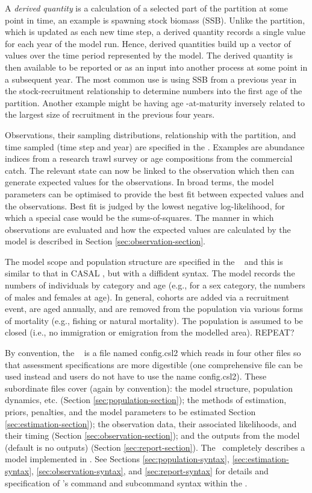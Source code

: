 A \emph{derived quantity} is a calculation of a selected part of the partition at some point in time, an example is spawning stock biomass (SSB). Unlike the partition, which is updated as each new time step, a derived quantity records a single value for each year of the model run. Hence, derived quantities build up a vector of values over the time period represented by the model. The derived quantity is then available to be reported or as an input into another process at some point in a subsequent year. The most common use is using SSB from a previous year in the stock-recruitment relationship to determine numbers into the first age of the partition. Another example might be having age -at-maturity inversely related to the largest size of recruitment in the previous four years.

Observations, their sampling distributions, relationship with the partition, and time sampled (time step and year) are specified in the \config. Examples are abundance indices from a research trawl survey or age compositions from the commercial catch. The relevant state can now be linked to the observation which then can generate expected values for the observations. In broad terms, the model parameters can be optimised to provide the best fit between expected values and the observations. Best fit is judged by the lowest negative log-likelihood, for which a special case would be the sums-of-squares. The manner in which observations are evaluated and how the expected values are calculated by the model is described in Section \ref{sec:observation-section}.

The model scope and population structure are  specified in the \config~ and this is similar to that in CASAL \citep{1388}, but with a diffident syntax. The model records the numbers of individuals by category and age (e.g., for a sex category, the numbers of males and females at age). In general, cohorts are added via a recruitment event, are aged annually, and are removed from the population via various forms of mortality (e.g., fishing or natural mortality). The population is assumed to be closed (i.e., no immigration or emigration from the modelled area). REPEAT?

By convention, the \config~ is a file named config.csl2 which reads in four other files so that assessment specifications are more digestible (one comprehensive file can be used instead and users do not have to use the name config.csl2). These subordinate files cover (again by convention): the model structure, population dynamics, etc. (Section \ref{sec:population-section}); the methods of estimation, priors, penalties, and the model parameters to be estimated Section \ref{sec:estimation-section}); the observation data, their associated likelihoods, and their timing (Section \ref{sec:observation-section}); and the outputs from the model (default is no outputs) (Section \ref{sec:report-section}). The \config~completely describes a model implemented in \CNAME. See Sections \ref{sec:population-syntax}, \ref{sec:estimation-syntax}, \ref{sec:observation-syntax}, and \ref{sec:report-syntax} for details and specification of \CNAME's command and subcommand syntax within the \config. 

